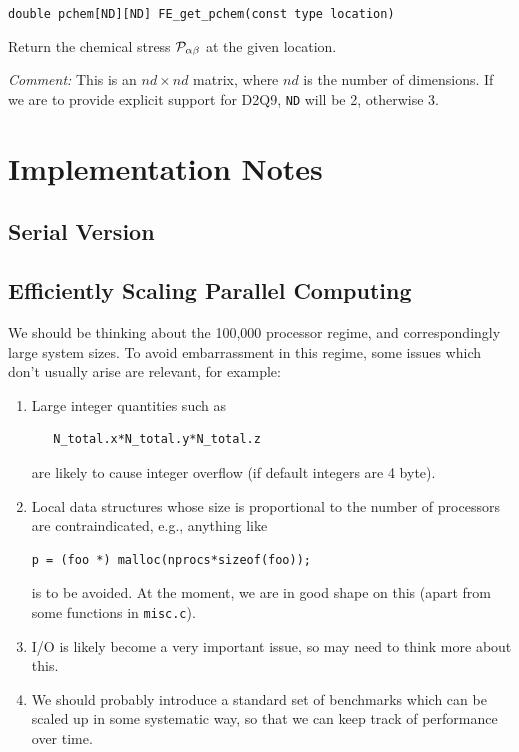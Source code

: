\texttt{double pchem[ND][ND] FE\_get\_pchem(const type location)}

Return the chemical stress ${\cal P}_{\alpha\beta}$ at the
given location.

\textit{Comment:} This is an $nd \times nd$ matrix, where $nd$ is
the number of dimensions. If we are to provide explicit support for
D2Q9, \texttt{ND} will be 2, otherwise 3.





\section{Implementation Notes}

\subsection{Serial Version}

\subsection{Efficiently Scaling Parallel Computing}

We should be thinking about the 100,000 processor regime, and
correspondingly large system sizes. To avoid embarrassment in this regime,
some issues which don't usually arise are relevant, for example:

\begin{enumerate}
\item
Large integer quantities such as
\begin{verbatim}
   N_total.x*N_total.y*N_total.z
\end{verbatim}
are likely to cause integer overflow (if default integers are 4 byte).
\item
Local data structures whose size is proportional
to the number of processors are contraindicated, e.g.,
anything like
\begin{verbatim}
p = (foo *) malloc(nprocs*sizeof(foo));
\end{verbatim}
is to be avoided. At the moment, we are in good shape on this
(apart from some functions in \texttt{misc.c}).
\item
I/O is likely become a very important issue, so may need to think
more about this.
\item
We should probably introduce a standard set of benchmarks which can
be scaled up in some systematic way, so that we can keep track of
performance over time.

\end{enumerate}


